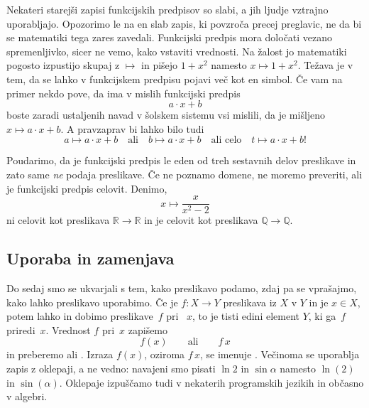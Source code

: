 Nekateri starejši zapisi funkcijskih predpisov so slabi, a jih ljudje vztrajno
uporabljajo. Opozorimo le na en slab zapis, ki povzroča precej preglavic, ne da bi se
matematiki tega zares zavedali. Funkcijski predpis mora določati vezano spremenljivko,
sicer ne vemo, kako vstaviti vrednosti. Na žalost jo matematiki pogosto izpustijo skupaj
z $\mapsto$ in pišejo $1 + x^2$ namesto $x \mapsto 1 + x^2$.
%
Težava je v tem, da se lahko v funkcijskem predpisu pojavi več kot en simbol. Če vam na primer nekdo pove, da ima v mislih funkcijski predpis
%
\begin{equation*}
  a \cdot x + b
\end{equation*}
%
boste zaradi ustaljenih navad v šolskem sistemu vsi mislili, da je mišljeno $x \mapsto a \cdot x + b$.
%
A pravzaprav bi lahko bilo tudi
%
\begin{equation*}
  a \mapsto a \cdot x + b
  \quad\text{ali}\quad
  b \mapsto a \cdot x + b
  \quad\text{ali celo}\quad
  t \mapsto a \cdot x + b!
\end{equation*}

Poudarimo, da je funkcijski predpis le eden od treh sestavnih delov preslikave in zato same \emph{ne} podaja preslikave.
%
Če ne poznamo domene, ne moremo preveriti, ali je funkcijski predpis celovit. Denimo,
%
\begin{equation*}
  x \mapsto \frac{x}{x^2 - 2}
\end{equation*}
%
ni celovit kot preslikava $\mathbb{R} \to \mathbb{R}$ in je celovit kot preslikava $\mathbb{Q} \to \mathbb{Q}$.


\subsection{Uporaba in zamenjava}
\label{sec:uporaba-in-zamenjava}

Do sedaj smo se ukvarjali s tem, kako preslikavo podamo, zdaj pa se vprašajmo, kako lahko
preslikavo uporabimo. Če je $f : X \to Y$ preslikava iz $X$ v $Y$ in je $x \in X$, potem
lahko  in dobimo  preslikave~$f$ pri
~$x$, to je tisti edini element $Y$, ki ga~$f$ priredi~$x$. Vrednost $f$
pri~$x$ zapišemo
%
\begin{equation*}
  f(x)
  \qquad\text{ali}\qquad
  f\,x
\end{equation*}
%
in preberemo  ali . Izraza $f(x)$, oziroma $f\,x$, se imenuje
. Večinoma se uporablja zapis z oklepaji, a ne vedno: navajeni smo pisati
$\ln 2$ in $\sin \alpha$ namesto $\ln(2)$ in $\sin(\alpha)$. Oklepaje izpuščamo tudi v
nekaterih programskih jezikih in občasno v algebri.

